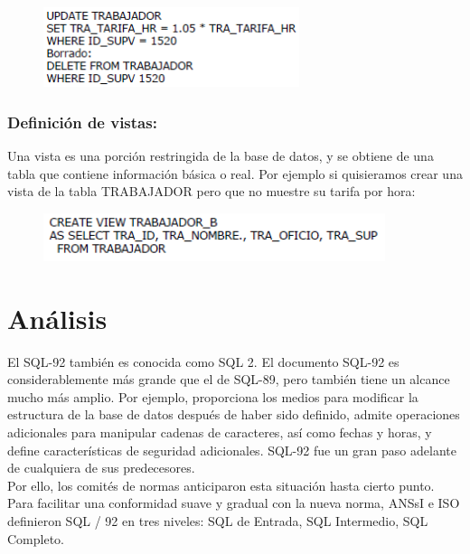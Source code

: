 \documentclass[preprint,12pt]{elsarticle}
\begin{document}
	\begin{figure}[htb]
		\begin{center}
			\includegraphics[width=7.5cm]{./IMAGENES/update}
		\end{center}
	\end{figure}

\subsubsection{\textbf{Definición de vistas:}}
Una vista es una porción restringida de la base de datos, y se obtiene de una tabla que contiene información básica o real. Por ejemplo si quisieramos crear una vista de la tabla TRABAJADOR pero que no muestre su tarifa por hora:

	\begin{figure}[htb]
		\begin{center}
			\includegraphics[width=10cm]{./IMAGENES/vistas1}
		\end{center}
	\end{figure}




\section{Análisis}

El SQL-92 también es conocida como SQL 2. El documento SQL-92 es considerablemente más grande que el de SQL-89, pero también tiene un alcance mucho más amplio. Por ejemplo, proporciona los medios para modificar la estructura de la base de datos después de haber sido definido, admite operaciones adicionales para manipular cadenas de caracteres, así como fechas y horas, y define características de seguridad adicionales. SQL-92 fue un gran paso adelante de cualquiera de sus predecesores.
\\ Por ello, los comités de normas anticiparon esta situación hasta cierto punto. Para facilitar una conformidad suave y gradual con la nueva norma, ANSsI e ISO definieron SQL / 92 en tres niveles: SQL de Entrada, SQL Intermedio, SQL Completo. \cite{Viescas2018}
\end{document}
